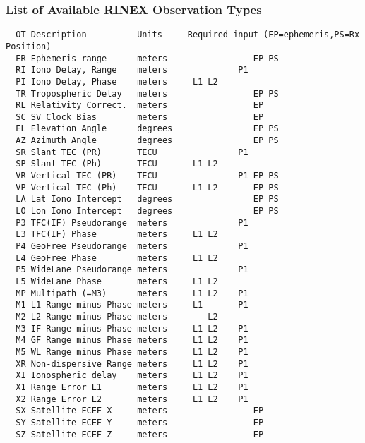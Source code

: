 \subsubsection{List of Available RINEX Observation Types}
\begin{\outputsize}
\begin{verbatim}
  OT Description          Units     Required input (EP=ephemeris,PS=Rx Position)
  ER Ephemeris range      meters                 EP PS
  RI Iono Delay, Range    meters              P1
  PI Iono Delay, Phase    meters     L1 L2
  TR Tropospheric Delay   meters                 EP PS
  RL Relativity Correct.  meters                 EP
  SC SV Clock Bias        meters                 EP
  EL Elevation Angle      degrees                EP PS
  AZ Azimuth Angle        degrees                EP PS
  SR Slant TEC (PR)       TECU                P1
  SP Slant TEC (Ph)       TECU       L1 L2
  VR Vertical TEC (PR)    TECU                P1 EP PS
  VP Vertical TEC (Ph)    TECU       L1 L2       EP PS
  LA Lat Iono Intercept   degrees                EP PS
  LO Lon Iono Intercept   degrees                EP PS
  P3 TFC(IF) Pseudorange  meters              P1
  L3 TFC(IF) Phase        meters     L1 L2
  P4 GeoFree Pseudorange  meters              P1
  L4 GeoFree Phase        meters     L1 L2
  P5 WideLane Pseudorange meters              P1
  L5 WideLane Phase       meters     L1 L2
  MP Multipath (=M3)      meters     L1 L2    P1
  M1 L1 Range minus Phase meters     L1       P1
  M2 L2 Range minus Phase meters        L2
  M3 IF Range minus Phase meters     L1 L2    P1
  M4 GF Range minus Phase meters     L1 L2    P1
  M5 WL Range minus Phase meters     L1 L2    P1
  XR Non-dispersive Range meters     L1 L2    P1
  XI Ionospheric delay    meters     L1 L2    P1
  X1 Range Error L1       meters     L1 L2    P1
  X2 Range Error L2       meters     L1 L2    P1
  SX Satellite ECEF-X     meters                 EP
  SY Satellite ECEF-Y     meters                 EP
  SZ Satellite ECEF-Z     meters                 EP
\end{verbatim}
\end{\outputsize}

%
